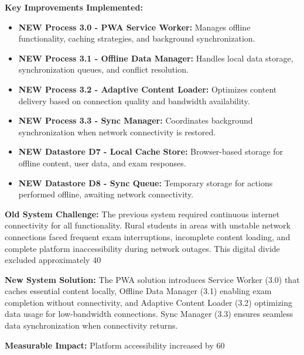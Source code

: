 \documentclass[12pt,a4paper,oneside]{book}
\begin{document}
\textbf{Key Improvements Implemented:}
\begin{itemize}
    \item \textbf{NEW Process 3.0 - PWA Service Worker:} Manages offline functionality, caching strategies, and background synchronization.
    \item \textbf{NEW Process 3.1 - Offline Data Manager:} Handles local data storage, synchronization queues, and conflict resolution.
    \item \textbf{NEW Process 3.2 - Adaptive Content Loader:} Optimizes content delivery based on connection quality and bandwidth availability.
    \item \textbf{NEW Process 3.3 - Sync Manager:} Coordinates background synchronization when network connectivity is restored.
    \item \textbf{NEW Datastore D7 - Local Cache Store:} Browser-based storage for offline content, user data, and exam responses.
    \item \textbf{NEW Datastore D8 - Sync Queue:} Temporary storage for actions performed offline, awaiting network connectivity.
\end{itemize}

\begin{tcolorbox}[impactbox, title=Case Study: Enabling Education Access in Rural Bangladesh]
\textbf{Old System Challenge:} The previous system required continuous internet connectivity for all functionality. Rural students in areas with unstable network connections faced frequent exam interruptions, incomplete content loading, and complete platform inaccessibility during network outages. This digital divide excluded approximately 40%

\textbf{New System Solution:} The PWA solution introduces Service Worker (3.0) that caches essential content locally, Offline Data Manager (3.1) enabling exam completion without connectivity, and Adaptive Content Loader (3.2) optimizing data usage for low-bandwidth connections. Sync Manager (3.3) ensures seamless data synchronization when connectivity returns.

\textbf{Measurable Impact:} Platform accessibility increased by 60%
\end{tcolorbox}
\end{document}
